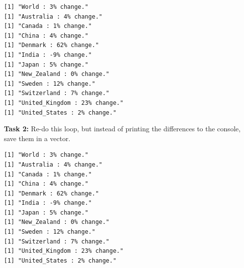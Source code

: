 \documentclass[
]{book}
\newenvironment{Shaded}{\begin{snugshade}}{\end{snugshade}}
\newcommand{\CommentTok}[1]{\textcolor[rgb]{0.56,0.35,0.01}{\textit{#1}}}
\newcommand{\ControlFlowTok}[1]{\textcolor[rgb]{0.13,0.29,0.53}{\textbf{#1}}}
\newcommand{\DecValTok}[1]{\textcolor[rgb]{0.00,0.00,0.81}{#1}}
\newcommand{\KeywordTok}[1]{\textcolor[rgb]{0.13,0.29,0.53}{\textbf{#1}}}
\newcommand{\NormalTok}[1]{#1}
\newcommand{\OperatorTok}[1]{\textcolor[rgb]{0.81,0.36,0.00}{\textbf{#1}}}
\newcommand{\StringTok}[1]{\textcolor[rgb]{0.31,0.60,0.02}{#1}}
\begin{document}
\begin{Shaded}
\end{Shaded}

\begin{verbatim}
[1] "World : 3% change."
[1] "Australia : 4% change."
[1] "Canada : 1% change."
[1] "China : 4% change."
[1] "Denmark : 62% change."
[1] "India : -9% change."
[1] "Japan : 5% change."
[1] "New_Zealand : 0% change."
[1] "Sweden : 12% change."
[1] "Switzerland : 7% change."
[1] "United_Kingdom : 23% change."
[1] "United_States : 2% change."
\end{verbatim}

\textbf{Task 2:} Re-do this loop, but instead of printing the differences to the console, save them in a vector.

\begin{Shaded}
\end{Shaded}

\begin{verbatim}
[1] "World : 3% change."
[1] "Australia : 4% change."
[1] "Canada : 1% change."
[1] "China : 4% change."
[1] "Denmark : 62% change."
[1] "India : -9% change."
[1] "Japan : 5% change."
[1] "New_Zealand : 0% change."
[1] "Sweden : 12% change."
[1] "Switzerland : 7% change."
[1] "United_Kingdom : 23% change."
[1] "United_States : 2% change."
\end{verbatim}
\end{document}
